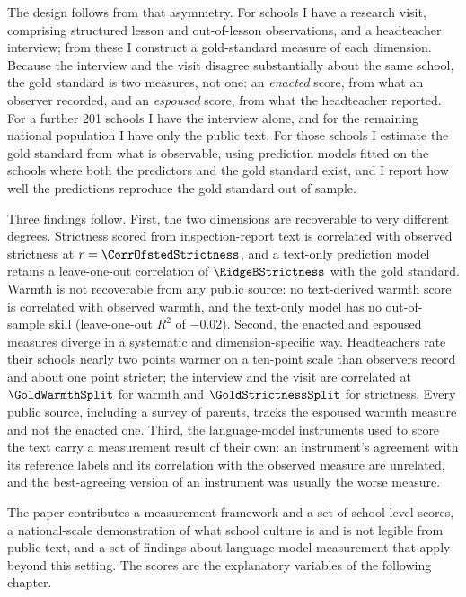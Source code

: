 The design follows from that asymmetry. For \NTierOne{} schools I have a
research visit, comprising structured lesson and out-of-lesson observations,
and a headteacher interview; from these I construct a gold-standard measure of
each dimension. Because the interview and the visit disagree substantially
about the same school, the gold standard is two measures, not one: an
\emph{enacted} score, from what an observer recorded, and an \emph{espoused}
score, from what the headteacher reported. For a further 201 schools I have
the interview alone, and for the remaining national population I have only
the public text. For those schools I estimate the gold standard from what is
observable, using prediction models fitted on the schools where both the
predictors and the gold standard exist, and I report how well the predictions
reproduce the gold standard out of sample.

Three findings follow. First, the two dimensions are recoverable to very
different degrees. Strictness scored from inspection-report text is
correlated with observed strictness at $r = \CorrOfstedStrictness$, and a
text-only prediction model retains a leave-one-out correlation of
$\RidgeBStrictness$ with the gold standard. Warmth is not recoverable from
any public source: no text-derived warmth score is correlated with observed
warmth, and the text-only model has no out-of-sample skill (leave-one-out
$R^2$ of $-0.02$). Second, the enacted and espoused measures diverge in a
systematic and dimension-specific way. Headteachers rate their schools nearly
two points warmer on a ten-point scale than observers record and about one
point stricter; the interview and
the visit are correlated at $\GoldWarmthSplit$ for warmth and
$\GoldStrictnessSplit$ for strictness. Every public source, including a
survey of parents, tracks the espoused warmth measure and not the enacted one.
Third, the language-model instruments used to score the text carry a
measurement result of their own: an instrument's agreement with its reference
labels and its correlation with the observed measure are unrelated, and the
best-agreeing version of an instrument was usually the worse measure.

The paper contributes a measurement framework and a set of school-level
scores, a national-scale demonstration of what school culture is and is not
legible from public text, and a set of findings about language-model
measurement that apply beyond this setting. The scores are the explanatory
variables of the following chapter.

